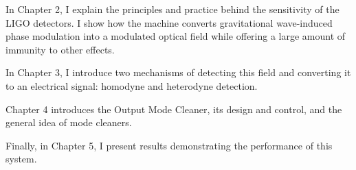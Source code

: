 In Chapter 2, I explain the principles and practice behind the
sensitivity of the LIGO detectors.  I show how the machine converts
gravitational wave-induced phase modulation into a modulated optical
field while offering a large amount of immunity to other effects.

In Chapter 3, I introduce two mechanisms of detecting this field and
converting it to an electrical signal:  homodyne and heterodyne
detection.

Chapter 4 introduces the Output Mode Cleaner, its design and control,
and the general idea of mode cleaners.

Finally, in Chapter 5, I present results demonstrating the performance
of this system.
